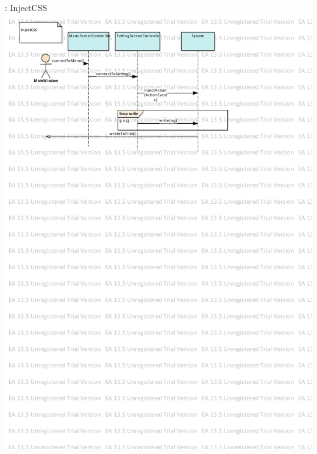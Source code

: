 \documentclass[12pt]{article}
\begin{document}
\begin{enumerate}
 : InjectCSS
\newpage
\includegraphics[scale=0.8]{injectAction.pdf}
\newpage


\end{enumerate}
\end{document}
